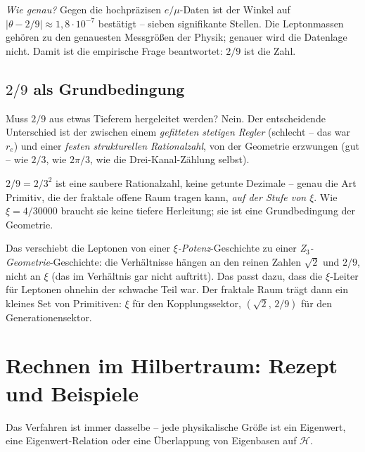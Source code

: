 \emph{Wie genau?} Gegen die hochpräzisen $e/\mu$-Daten ist der Winkel auf
$|\theta-2/9|\approx1{,}8\cdot10^{-7}$ bestätigt -- sieben signifikante Stellen.
Die Leptonmassen gehören zu den genauesten Messgrößen der Physik; genauer wird
die Datenlage nicht. Damit ist die empirische Frage beantwortet: $2/9$ ist die
Zahl.

\subsection{$2/9$ als Grundbedingung}

Muss $2/9$ aus etwas Tieferem hergeleitet werden? Nein. Der entscheidende
Unterschied ist der zwischen einem \emph{gefitteten stetigen Regler} (schlecht
-- das war $r_e$) und einer \emph{festen strukturellen Rationalzahl}, von der
Geometrie erzwungen (gut -- wie $2/3$, wie $2\pi/3$, wie die Drei-Kanal-Zählung
selbst).

\begin{foundation}
$2/9=2/3^2$ ist eine saubere Rationalzahl, keine getunte Dezimale -- genau die
Art Primitiv, die der fraktale offene Raum tragen kann, \emph{auf der Stufe von
$\xi$}. Wie $\xi=4/30000$ braucht sie keine tiefere Herleitung; sie ist eine
Grundbedingung der Geometrie.
\end{foundation}

Das verschiebt die Leptonen von einer \emph{$\xi$-Potenz}-Geschichte zu einer
\emph{Z$_3$-Geometrie}-Geschichte: die Verhältnisse hängen an den reinen Zahlen
$\sqrt2$ und $2/9$, nicht an $\xi$ (das im Verhältnis gar nicht auftritt). Das
passt dazu, dass die $\xi$-Leiter für Leptonen ohnehin der schwache Teil war.
Der fraktale Raum trägt dann ein kleines Set von Primitiven: $\xi$ für den
Kopplungssektor, $(\sqrt2,\,2/9)$ für den Generationensektor.

\section{Rechnen im Hilbertraum: Rezept und Beispiele}

Das Verfahren ist immer dasselbe -- jede physikalische Größe ist ein Eigenwert,
eine Eigenwert-Relation oder eine Überlappung von Eigenbasen auf $\mathcal{H}$.

